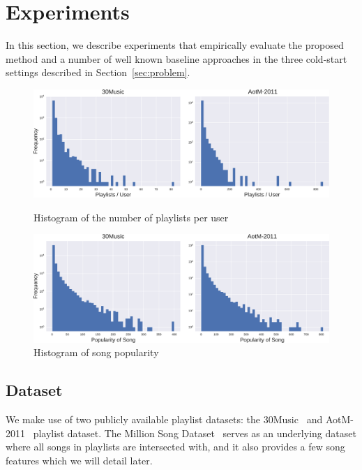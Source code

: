 \section{Experiments}
\label{sec:experiment}

In this section, we describe experiments that empirically evaluate the proposed method and a number of 
well known baseline approaches in the three cold-start settings described in Section~\ref{sec:problem}.

\begin{figure}[!t]
    \centering
    \begin{minipage}{.5\textwidth}
        \centering
        \includegraphics[width=.95\linewidth]{fig/hist_pluser.pdf}
        \caption{Histogram of the number of playlists per user}
        \label{fig:hist_pluser}
    \end{minipage}%
    \begin{minipage}{0.5\textwidth}
        \centering
        \includegraphics[width=.95\linewidth]{fig/hist_songpop.pdf}
        \caption{Histogram of song popularity}
        \label{fig:hist_songpop}
    \end{minipage}
\end{figure}


\subsection{Dataset}
We make use of two publicly available playlist datasets: the 30Music~\cite{30music2015} and AotM-2011~\cite{mcfee2012hypergraph} playlist dataset.
The Million Song Dataset~\cite{msd2011} serves as an underlying dataset where all songs in playlists are intersected with,
and it also provides a few song features which we will detail later.



